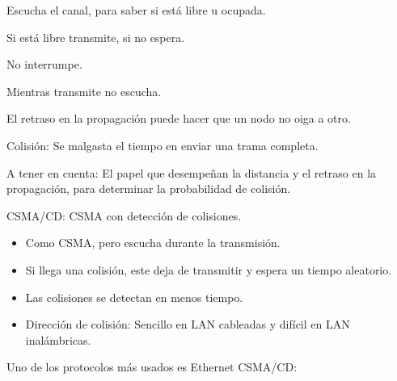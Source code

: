 \documentclass[12pt, twoside, openright]{report} %
\begin{document}
          Escucha el canal, para saber si está libre u ocupada.

          Si está libre transmite, si no espera.

          No interrumpe.

          Mientras transmite no escucha.

          El retraso en la propagación puede hacer que un nodo no oiga a
          otro.

          Colisión: Se malgasta el tiempo en enviar una trama completa.

          A tener en cuenta: El papel que desempeñan la distancia y el
          retraso en la propagación, para determinar la probabilidad de
          colisión.

          CSMA/CD: CSMA con detección de colisiones.

          \begin{itemize}
          \item
            Como CSMA, pero escucha durante la transmisión.
          \item
            Si llega una colisión, este deja de transmitir y espera un
            tiempo aleatorio.
          \item
            Las colisiones se detectan en menos tiempo.
          \item
            Dirección de colisión: Sencillo en LAN cableadas y difícil
            en LAN inalámbricas.
          \end{itemize}

          Uno de los protocolos más usados es Ethernet CSMA/CD:
\end{document}
